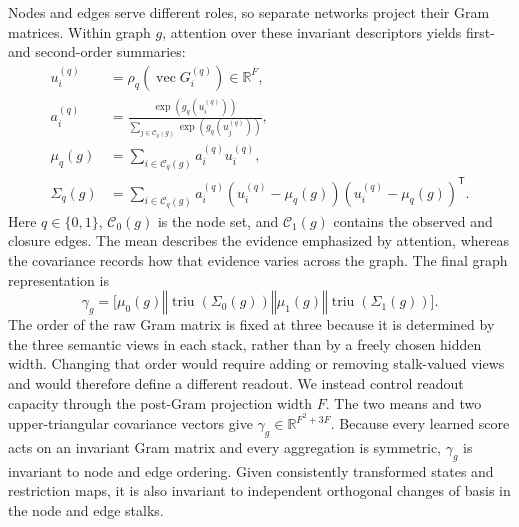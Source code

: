 \documentclass[sigconf,anonymous,review]{acmart}
\newcommand{\R}{\mathbb{R}}
\newcommand{\transpose}{\mathsf{T}}
\newcommand{\concat}{\mathbin\Vert}
\begin{document}
Nodes and edges serve different roles, so separate networks project their Gram matrices.
Within graph \(g\), attention over these invariant descriptors yields first- and second-order
summaries:
\begin{equation}
  \begin{aligned}
   u_i^{(q)}&=\rho_q(\operatorname{vec}G_i^{(q)})\in\R^{F},\\
   a_i^{(q)}
   &=\frac{\exp(g_q(u_i^{(q)}))}
           {\sum_{j\in\mathcal{C}_q(g)}\exp(g_q(u_j^{(q)}))},\\
   \mu_q(g)&=\sum_{i\in\mathcal{C}_q(g)}a_i^{(q)}u_i^{(q)},\\
   \Sigma_q(g)&=\sum_{i\in\mathcal{C}_q(g)}a_i^{(q)}
     (u_i^{(q)}-\mu_q(g))(u_i^{(q)}-\mu_q(g))^{\transpose}.
  \end{aligned}
  \label{eq:pool-moments}
\end{equation}
Here \(q\in\{0,1\}\), \(\mathcal{C}_0(g)\) is the node set, and \(\mathcal{C}_1(g)\) contains the observed and closure
edges. The mean describes the evidence emphasized by attention, whereas the covariance
records how that evidence varies across the graph. The final graph representation is
\begin{equation}
  \gamma_g=
  \bigl[
  \mu_0(g)\concat\operatorname{triu}(\Sigma_0(g))
  \concat\mu_1(g)\concat\operatorname{triu}(\Sigma_1(g))
  \bigr].
  \label{eq:pool-summary}
\end{equation}
The order of the raw Gram matrix is fixed at three because it is determined by the three
semantic views in each stack, rather than by a freely chosen hidden width. Changing that order
would require adding or removing stalk-valued views and would therefore define a different readout.
We instead control readout capacity through the post-Gram projection width \(F\). The two means and
two upper-triangular covariance vectors give \(\gamma_g\in\R^{F^2+3F}\).
Because every learned score acts on an invariant Gram matrix and every aggregation is
symmetric, \(\gamma_g\) is invariant to node and edge ordering. Given consistently transformed
states and restriction maps, it is also invariant to independent orthogonal changes of basis in
the node and edge stalks.
\end{document}
